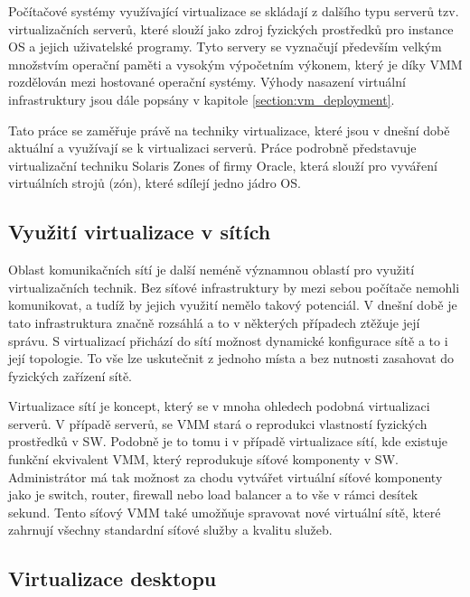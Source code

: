   Počítačové systémy využívající virtualizace se skládají z dalšího typu serverů tzv. virtualizačních serverů, které slouží jako zdroj fyzických prostředků pro instance OS a jejich uživatelské programy. Tyto servery
  se vyznačují především velkým množstvím operační paměti a vysokým výpočetním výkonem, který je díky VMM rozdělován mezi hostované operační systémy. Výhody nasazení virtuální infrastruktury jsou dále popsány v
  kapitole \ref{section:vm_deployment}.

  Tato práce se zaměřuje právě na techniky virtualizace, které jsou v dnešní době aktuální a využívají se k virtualizaci serverů. Práce podrobně představuje virtualizační techniku Solaris Zones of firmy Oracle,
  která slouží pro vyváření virtuálních strojů (zón), které sdílejí jedno jádro OS.

  \subsection{Využití virtualizace v sítích}
  \label{subsection:network_virtualization}

  Oblast komunikačních sítí je další neméně významnou oblastí pro využití virtualizačních technik. Bez síťové infrastruktury by mezi sebou počítače nemohli komunikovat, a tudíž by jejich využití nemělo takový potenciál.
  V dnešní době je tato infrastruktura značně rozsáhlá a to v některých případech ztěžuje její správu. S virtualizací přichází do sítí možnost dynamické konfigurace sítě a to i její topologie. To vše lze uskutečnit z 
  jednoho místa a bez nutnosti zasahovat do fyzických zařízení sítě.

  Virtualizace sítí je koncept, který se v mnoha ohledech podobná virtualizaci serverů. V případě serverů, se VMM stará o reprodukci vlastností fyzických prostředků v SW. Podobně je to tomu i v případě virtualizace sítí,
  kde existuje funkční ekvivalent VMM, který reprodukuje síťové komponenty v SW. Administrátor má tak možnost za chodu vytvářet virtuální síťové komponenty jako je switch, router, firewall nebo load balancer a to vše v
  rámci desítek sekund. Tento síťový VMM také umožňuje spravovat nové virtuální sítě, které zahrnují všechny standardní síťové služby a kvalitu služeb.\cite{article:vmware:network_virtualization}

  \subsection{Virtualizace desktopu}
  \label{subsection:desktop_virtualization}
  
